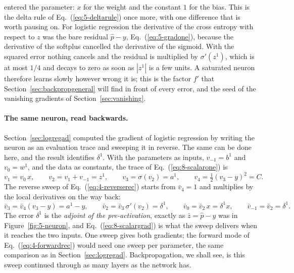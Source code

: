 entered the parameter: $x$ for the weight and the constant $1$ for the bias.
This is the delta rule of Eq.~(\ref{eq:5-deltarule}) once more, with one
difference that is worth pausing on.  For logistic regression the derivative
of the cross entropy with respect to $z$ was the bare residual $\hat p-y$,
Eq.~(\ref{eq:5-gradone}), because the derivative of the softplus cancelled
the derivative of the sigmoid.  With the squared error nothing cancels and the
residual is multiplied by $\sigma'(z^{1})$, which is at most $1/4$ and
decays to zero as soon as $|z^{1}|$ is a few units.  A saturated neuron
therefore learns slowly however wrong it is; this is the factor $f'$ that
Section~\ref{sec:backpropgeneral} will find in front of every error, and the
seed of the vanishing gradients of Section~\ref{sec:vanishing}.

\paragraph{The same neuron, read backwards.}
Section~\ref{sec:logregad} computed the gradient of logistic regression by
writing the neuron as an evaluation trace and sweeping it in reverse.  The
same can be done here, and the result identifies $\delta^{1}$.  With the
parameters as inputs, $v_{-1}=b^{1}$ and $v_{0}=w^{1}$, and the data as
constants, the trace of Eq.~(\ref{eq:8-scalarone}) is
\begin{equation}
  v_{1}=v_{0}\,x,\qquad
  v_{2}=v_{1}+v_{-1}=z^{1},\qquad
  v_{3}=\sigma(v_{2})=a^{1},\qquad
  v_{4}=\tfrac12\left(v_{3}-y\right)^{2}=C .
  \label{eq:8-scalartrace}
\end{equation}
The reverse sweep of Eq.~(\ref{eq:4-reverserec}) starts from $\bar v_{4}=1$
and multiplies by the local derivatives on the way back:
\begin{equation}
  \bar v_{3}=\bar v_{4}\left(v_{3}-y\right)=a^{1}-y,\qquad
  \bar v_{2}=\bar v_{3}\,\sigma'(v_{2})=\delta^{1},\qquad
  \bar v_{0}=\bar v_{2}\,x=\delta^{1}x,\qquad
  \bar v_{-1}=\bar v_{2}=\delta^{1} .
  \label{eq:8-scalarreverse}
\end{equation}
The error $\delta^{1}$ is the \emph{adjoint of the pre-activation}, exactly as
$\bar z=\hat p-y$ was in Figure~\ref{fig:5-neuron}, and
Eq.~(\ref{eq:8-scalargrad}) is what the sweep delivers when it reaches the two
inputs.  One sweep gives both gradients; the forward mode of
Eq.~(\ref{eq:4-forwardrec}) would need one sweep per parameter, the same
comparison as in Section~\ref{sec:logregad}.  Backpropagation, we shall see,
is this sweep continued through as many layers as the network has.

